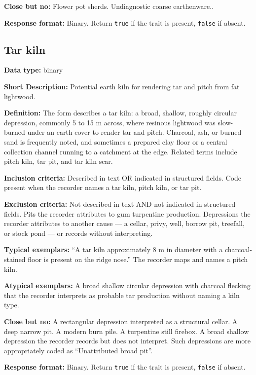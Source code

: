 \documentclass[
]{article}
\begin{document}
\textbf{Close but no:} Flower pot sherds. Undiagnostic coarse
earthenware..

\textbf{Response format:} Binary. Return \texttt{true} if the trait is
present, \texttt{false} if absent.

\subsection{Tar kiln}\label{tar-kiln}

\textbf{Data type:} binary

\textbf{Short Description:} Potential earth kiln for rendering tar and
pitch from fat lightwood.

\textbf{Definition:} The form describes a tar kiln: a broad, shallow,
roughly circular depression, commonly 5 to 15 m across, where resinous
lightwood was slow-burned under an earth cover to render tar and pitch.
Charcoal, ash, or burned sand is frequently noted, and sometimes a
prepared clay floor or a central collection channel running to a
catchment at the edge. Related terms include pitch kiln, tar pit, and
tar kiln scar.

\textbf{Inclusion criteria:} Described in text OR indicated in
structured fields. Code present when the recorder names a tar kiln,
pitch kiln, or tar pit.

\textbf{Exclusion criteria:} Not described in text AND not indicated in
structured fields. Pits the recorder attributes to gum turpentine
production. Depressions the recorder attributes to another cause --- a
cellar, privy, well, borrow pit, treefall, or stock pond --- or records
without interpreting.

\textbf{Typical exemplars:} ``A tar kiln approximately 8 m in diameter
with a charcoal-stained floor is present on the ridge nose.'' The
recorder maps and names a pitch kiln.

\textbf{Atypical exemplars:} A broad shallow circular depression with
charcoal flecking that the recorder interprets as probable tar
production without naming a kiln type.

\textbf{Close but no:} A rectangular depression interpreted as a
structural cellar. A deep narrow pit. A modern burn pile. A turpentine
still firebox. A broad shallow depression the recorder records but does
not interpret. Such depressions are more appropriately coded as
``Unattributed broad pit''.

\textbf{Response format:} Binary. Return \texttt{true} if the trait is
present, \texttt{false} if absent.
\end{document}
